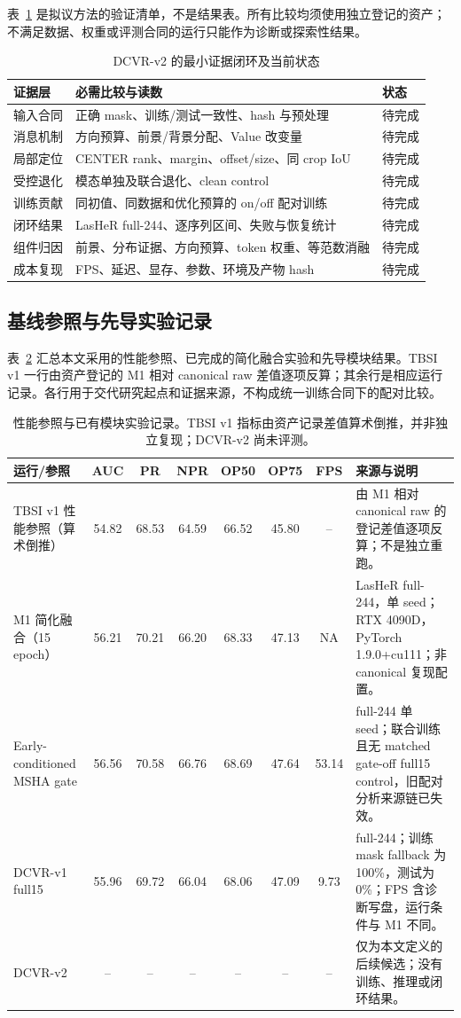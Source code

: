 \documentclass[journal]{IEEEtran}
\begin{document}
表~\ref{tab:closure} 是拟议方法的验证清单，不是结果表。所有比较均须使用独立登记的资产；不满足数据、权重或评测合同的运行只能作为诊断或探索性结果。
\begin{table}[!t]
\centering
\caption{DCVR-v2 的最小证据闭环及当前状态}
\label{tab:closure}
\small
\begin{tabular}{@{}p{1.55cm}p{4.25cm}p{1.05cm}@{}}
\toprule
证据层 & 必需比较与读数 & 状态\\
\midrule
输入合同 & 正确 mask、训练/测试一致性、hash 与预处理 & 待完成\\
消息机制 & 方向预算、前景/背景分配、Value 改变量 & 待完成\\
局部定位 & CENTER rank、margin、offset/size、同 crop IoU & 待完成\\
受控退化 & 模态单独及联合退化、clean control & 待完成\\
训练贡献 & 同初值、同数据和优化预算的 on/off 配对训练 & 待完成\\
闭环结果 & LasHeR full-244、逐序列区间、失败与恢复统计 & 待完成\\
组件归因 & 前景、分布证据、方向预算、token 权重、等范数消融 & 待完成\\
成本复现 & FPS、延迟、显存、参数、环境及产物 hash & 待完成\\
\bottomrule
\end{tabular}
\end{table}

\subsection{基线参照与先导实验记录}
表~\ref{tab:existing} 汇总本文采用的性能参照、已完成的简化融合实验和先导模块结果。TBSI v1 一行由资产登记的 M1 相对 canonical raw 差值逐项反算；其余行是相应运行记录。各行用于交代研究起点和证据来源，不构成统一训练合同下的配对比较。
\begin{table}[t]
\centering
\caption{性能参照与已有模块实验记录。TBSI v1 指标由资产记录差值算术倒推，并非独立复现；DCVR-v2 尚未评测。}
\label{tab:existing}
\small
\begin{tabular}{lccccccp{6.1cm}}
\toprule
运行/参照 & AUC & PR & NPR & OP50 & OP75 & FPS & 来源与说明\\
\midrule
TBSI v1 性能参照（算术倒推） & 54.82 & 68.53 & 64.59 & 66.52 & 45.80 & -- & 由 M1 相对 canonical raw 的登记差值逐项反算；不是独立重跑。\\
M1 简化融合（15 epoch） & 56.21 & 70.21 & 66.20 & 68.33 & 47.13 & NA & LasHeR full-244，单 seed；RTX 4090D，PyTorch 1.9.0+cu111；非 canonical 复现配置。\\
Early-conditioned MSHA gate & 56.56 & 70.58 & 66.76 & 68.69 & 47.64 & 53.14 & full-244 单 seed；联合训练且无 matched gate-off full15 control，旧配对分析来源链已失效。\\
DCVR-v1 full15 & 55.96 & 69.72 & 66.04 & 68.06 & 47.09 & 9.73 & full-244；训练 mask fallback 为 100\%，测试为 0\%；FPS 含诊断写盘，运行条件与 M1 不同。\\
DCVR-v2 & -- & -- & -- & -- & -- & -- & 仅为本文定义的后续候选；没有训练、推理或闭环结果。\\
\bottomrule
\end{tabular}
\end{table}
\end{document}
